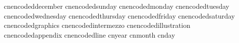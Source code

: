    cnencodeddecember         {}
   cnencodedsunday           {}
   cnencodedmonday           {}
   cnencodedtuesday          {}
   cnencodedwednesday        {}
   cnencodedthursday         {}
   cnencodedfriday           {}
   cnencodedsaturday         {}
   cnencodedgraphics	   {}
   cnencodedintermezzo	   {}
   cnencodedillustration	   {}
   cnencodedappendix	   {}
   cnencodedline		   {}
   cnyear                    {}
   cnmonth                   {}
   cnday                     {}
\stopencoding

